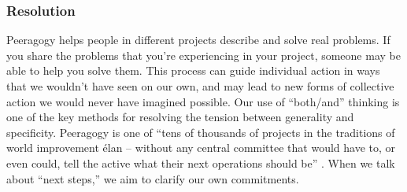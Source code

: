 

\subsubsection*{Resolution}
Peeragogy helps people in different projects describe and solve real problems. 
If you share the problems that you're experiencing in your project, someone may be able to help you solve them.
This process can guide individual action in ways that we wouldn't have seen on our own, and may lead to new forms of collective action we would never have imagined possible.
%
Our use of ``both/and'' thinking is one of the key methods for resolving the tension between generality and specificity.
Peeragogy is one of ``tens of thousands of projects in the traditions of world improvement \'elan -- without any central committee that would have to, or even could, tell the active what their next operations should be'' \cite[p. 402]{sloterdijk2013change}.  When we talk about ``next steps,'' we aim to clarify our own commitments.

